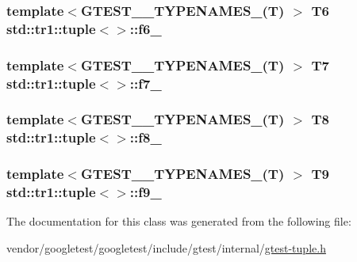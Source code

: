 \subsubsection[{\texorpdfstring{f6\+\_\+}{f6_}}]{\setlength{\rightskip}{0pt plus 5cm}template$<$G\+T\+E\+S\+T\+\_\+\_\+\+T\+Y\+P\+E\+N\+A\+M\+E\+S\+\_\+(\+T) $>$ T6 {\bf std\+::tr1\+::tuple}$<$$>$\+::f6\+\_\+}\hypertarget{classstd_1_1tr1_1_1tuple_a597beab3af3f95c84408491ab14632b0}{}\label{classstd_1_1tr1_1_1tuple_a597beab3af3f95c84408491ab14632b0}
\subsubsection[{\texorpdfstring{f7\+\_\+}{f7_}}]{\setlength{\rightskip}{0pt plus 5cm}template$<$G\+T\+E\+S\+T\+\_\+\_\+\+T\+Y\+P\+E\+N\+A\+M\+E\+S\+\_\+(\+T) $>$ T7 {\bf std\+::tr1\+::tuple}$<$$>$\+::f7\+\_\+}\hypertarget{classstd_1_1tr1_1_1tuple_a7c28780e616d382833e844f62672c6bc}{}\label{classstd_1_1tr1_1_1tuple_a7c28780e616d382833e844f62672c6bc}
\subsubsection[{\texorpdfstring{f8\+\_\+}{f8_}}]{\setlength{\rightskip}{0pt plus 5cm}template$<$G\+T\+E\+S\+T\+\_\+\_\+\+T\+Y\+P\+E\+N\+A\+M\+E\+S\+\_\+(\+T) $>$ T8 {\bf std\+::tr1\+::tuple}$<$$>$\+::f8\+\_\+}\hypertarget{classstd_1_1tr1_1_1tuple_ae859012c83943e54e035a4a32089ccb6}{}\label{classstd_1_1tr1_1_1tuple_ae859012c83943e54e035a4a32089ccb6}
\subsubsection[{\texorpdfstring{f9\+\_\+}{f9_}}]{\setlength{\rightskip}{0pt plus 5cm}template$<$G\+T\+E\+S\+T\+\_\+\_\+\+T\+Y\+P\+E\+N\+A\+M\+E\+S\+\_\+(\+T) $>$ T9 {\bf std\+::tr1\+::tuple}$<$$>$\+::f9\+\_\+}\hypertarget{classstd_1_1tr1_1_1tuple_a336d5e582fd34e45ec88c78d473671dd}{}\label{classstd_1_1tr1_1_1tuple_a336d5e582fd34e45ec88c78d473671dd}


The documentation for this class was generated from the following file\+:\begin{DoxyCompactItemize}
\item 
vendor/googletest/googletest/include/gtest/internal/\hyperlink{gtest-tuple_8h}{gtest-\/tuple.\+h}\end{DoxyCompactItemize}
